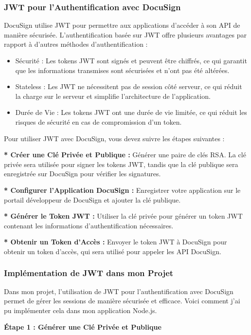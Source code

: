\subsubsection{ JWT pour l'Authentification avec DocuSign}
DocuSign utilise JWT pour permettre aux applications d'accéder à son API de manière sécurisée. L'authentification basée sur JWT offre plusieurs avantages par rapport à d'autres méthodes d'authentification :

\begin{itemize}

\item Sécurité : Les tokens JWT sont signés et peuvent être chiffrés, ce qui garantit que les informations transmises sont sécurisées et n'ont pas été altérées.
\item Stateless : Les JWT ne nécessitent pas de session côté serveur, ce qui réduit la charge sur le serveur et simplifie l'architecture de l'application.
\item Durée de Vie : Les tokens JWT ont une durée de vie limitée, ce qui réduit les risques de sécurité en cas de compromission d'un token.
\end{itemize}
Pour utiliser JWT avec DocuSign, vous devez suivre les étapes suivantes :

\textbf{ * Créer une Clé Privée et Publique :} Générer une paire de clés RSA. La clé privée sera utilisée pour signer les tokens JWT, tandis que la clé publique sera enregistrée sur DocuSign pour vérifier les signatures.

\textbf{ * Configurer l'Application DocuSign :} Enregistrer votre application sur le portail développeur de DocuSign et ajouter la clé publique.

\textbf{* Générer le Token JWT : } Utiliser la clé privée pour générer un token JWT contenant les informations d'authentification nécessaires.

\textbf{ * Obtenir un Token d'Accès : }Envoyer le token JWT à DocuSign pour obtenir un token d'accès, qui sera utilisé pour appeler les API DocuSign.

\subsubsection{Implémentation de JWT dans mon Projet}
Dans mon projet, l'utilisation de JWT pour l'authentification avec DocuSign permet de gérer les sessions de manière sécurisée et efficace. Voici comment j'ai pu implémenter cela dans mon application Node.js.

\textbf{Étape 1 : Générer une Clé Privée et Publique}


